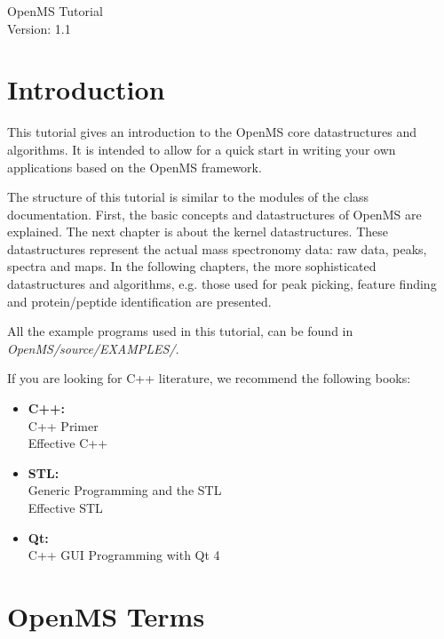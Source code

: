 \documentclass[a4paper]{article}
\begin{document}
\begin{titlepage}
\vspace*{7cm}
\begin{center}
{\Large OpenMS Tutorial\\[1ex]\large Version: 1.1 }\\
\end{center}
\end{titlepage}


\setcounter{tocdepth}{2}
\tableofcontents
\pagebreak

\section{Introduction}

	This tutorial gives an introduction to the OpenMS core datastructures and algorithms.
	It is intended to allow for a quick start in writing your own applications based on
	the OpenMS framework.
	
	The structure of this tutorial is similar to the modules of the class documentation.
	First, the basic concepts and datastructures of OpenMS are explained. The next chapter is
	about the kernel datastructures. These datastructures represent the actual mass spectronomy
	data: raw data, peaks, spectra and maps. In the following chapters, the more sophisticated 
	datastructures and algorithms, e.g. those used for peak picking, feature finding and protein/peptide 
	identification are presented.
	
	All the example programs used in this tutorial, can be found in {\em OpenMS/source/EXAMPLES/}.

	If you are looking for C++ literature, we recommend the following books:
	\begin{itemize}
		\item {\bf C++:}\\ C++ Primer\\ Effective C++
		\item {\bf STL:}\\ Generic Programming and the STL\\ Effective STL
		\item {\bf Qt:}\\ C++ GUI Programming with Qt 4
	\end{itemize}


\pagebreak
\section{OpenMS Terms}
	
\end{document}
